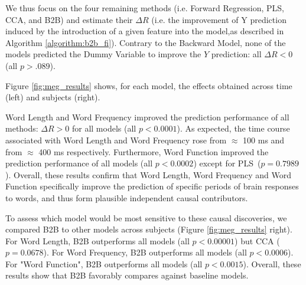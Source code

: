 We thus focus on the four remaining methods (i.e. Forward Regression, PLS, CCA,
and B2B) and estimate their $\Delta R$ (i.e. the improvement of Y prediction
induced by the introduction of a given feature into the model,as described in
Algorithm \ref{algorithm:b2b_fi}). Contrary to the Backward Model, none of the
models predicted the Dummy Variable to improve the $Y$ prediction: all $\Delta R
< 0$ (all $p > .089$).

Figure \ref{fig:meg_results} shows, for each model, the effects obtained across
time (left) and subjects (right).

Word Length and Word Frequency improved the prediction performance of all
methods: $\Delta R>0$ for all models (all $p<0.0001$). As expected, the time
course associated with Word Length and Word Frequency rose from $\approx$ 100 ms
and from $\approx$ 400 ms respectively. Furthermore, Word Function improved the
prediction performance of all models (all $p < 0.0002$) except for
PLS~($p=0.7989$). Overall, these results confirm that Word Length, Word
Frequency and Word Function specifically improve the prediction of specific periods of brain
responses to words, and thus form plausible independent causal contributors.

To assess which model would be most sensitive to these causal discoveries, we
compared B2B to other models across subjects (Figure \ref{fig:meg_results}
right). For Word Length, B2B outperforms all models (all $p < 0.00001$) but CCA
($p=0.0678$). For Word Frequency, B2B outperforms all models (all $p < 0.0006$).
For "Word Function", B2B outperforms all models (all $p < 0.0015$). Overall,
these results show that B2B favorably compares against baseline models.
